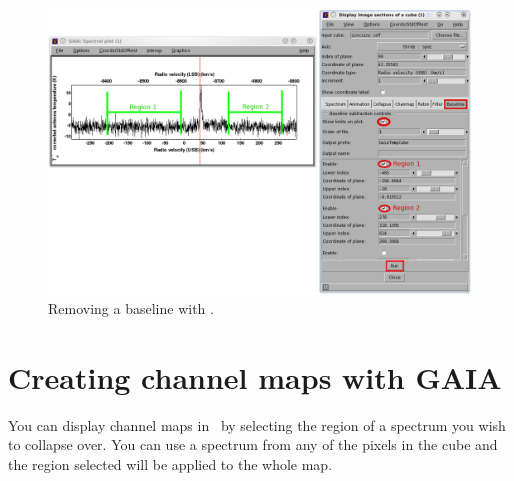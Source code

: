 \documentclass[11pt,oneside,chapters]{starlink}
\begin{document}
\begin{figure}[h!]
\begin{center}
\includegraphics[width=0.9\linewidth]{sc20_gaia_baseline}
\caption[Removing a baseline with \gaia.]{\label{fig:gaiabaseline}
  Removing a baseline with \gaia.}
\end{center}
\end{figure}

\section{Creating channel maps with GAIA}
\label{sec:gaiachannel}

You can display channel maps in \gaia\ by selecting the region of a
spectrum you wish to collapse over. You can use a spectrum from any of
the pixels in the cube and the region selected will be applied to the
whole map.
\end{document}

